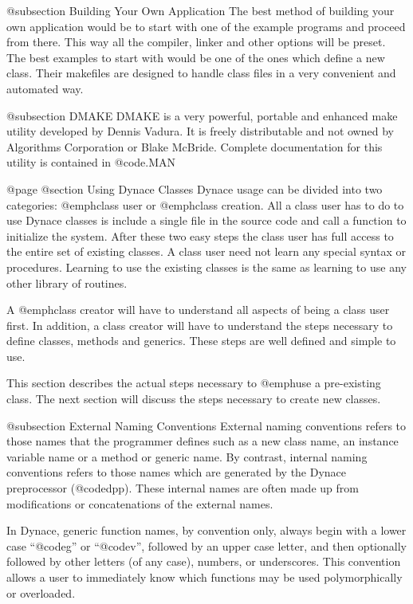 @subsection Building Your Own Application
The best method of building your own application would be to start
with one of the example programs and proceed from there.  This way
all the compiler, linker and other options will be preset.  The best
examples to start with would be one of the ones which define a new
class.  Their makefiles are designed to handle class files in
a very convenient and automated way.

@subsection DMAKE
DMAKE is a very powerful, portable and enhanced make utility developed
by Dennis Vadura.  It is freely distributable and not owned by
Algorithms Corporation or Blake McBride.  Complete documentation for this utility
is contained in @code{\DYNACE\DOCS\DMAKE.MAN}





@page
@section Using Dynace Classes
Dynace usage can be divided into two categories: @emph{class user} or
@emph{class creation}.  All a class user has to do to use Dynace classes
is include a single file in the source code and call a function to
initialize the system.  After these two easy steps the class user has full
access to the entire set of existing classes.  A class user need not learn
any special syntax or procedures.  Learning to use the existing classes
is the same as learning to use any other library of routines.

A @emph{class creator} will have to understand all aspects of being a
class user first.  In addition, a class creator will have to understand
the steps necessary to define classes, methods and generics.  These
steps are well defined and simple to use.

This section describes the actual steps necessary to @emph{use} a
pre-existing class.  The next section will discuss the steps necessary
to create new classes.

@subsection External Naming Conventions
External naming conventions refers to those names that the programmer
defines such as a new class name, an instance variable name or a method
or generic name.  By contrast, internal naming conventions refers to
those names which are generated by the Dynace preprocessor (@code{dpp}).
These internal names are often made up from modifications or
concatenations of the external names.

In Dynace, generic function names, by convention only, always begin with
a lower case ``@code{g}'' or ``@code{v}'', followed by an upper case
letter, and then optionally followed by other letters (of any case),
numbers, or underscores.  This convention allows a user to immediately
know which functions may be used polymorphically or overloaded.

